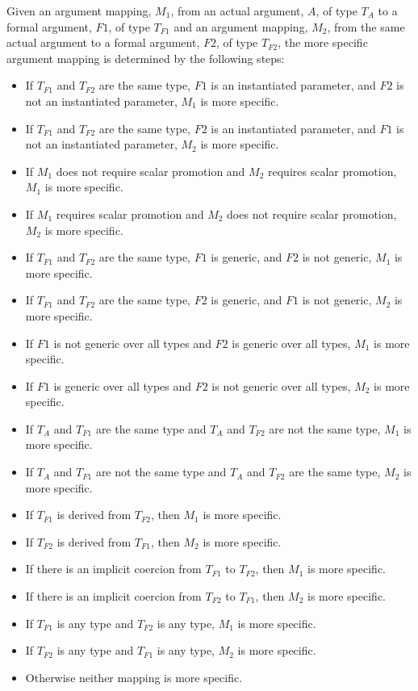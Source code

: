 Given an argument mapping, $M_1$, from an actual argument, $A$, of
type $T_A$ to a formal argument, $F1$, of type $T_{F1}$ and an
argument mapping, $M_2$, from the same actual argument to a formal
argument, $F2$, of type $T_{F2}$, the more specific argument mapping
is determined by the following steps:
\begin{itemize}
\item
 If $T_{F1}$ and $T_{F2}$ are the same type, $F1$ is an instantiated
 parameter, and $F2$ is not an instantiated parameter, $M_1$ is more
 specific.
\item
 If $T_{F1}$ and $T_{F2}$ are the same type, $F2$ is an instantiated
 parameter, and $F1$ is not an instantiated parameter, $M_2$ is more
 specific.
\item
 If $M_1$ does not require scalar promotion and $M_2$ requires scalar
 promotion, $M_1$ is more specific.
\item
 If $M_1$ requires scalar promotion and $M_2$ does not require scalar
 promotion, $M_2$ is more specific.
\item
 If $T_{F1}$ and $T_{F2}$ are the same type, $F1$ is generic, and $F2$
 is not generic, $M_1$ is more specific.
\item
 If $T_{F1}$ and $T_{F2}$ are the same type, $F2$ is generic, and $F1$
 is not generic, $M_2$ is more specific.
\item
 If $F1$ is not generic over all types and $F2$ is generic over all
 types, $M_1$ is more specific.
\item
 If $F1$ is generic over all types and $F2$ is not generic over all
 types, $M_2$ is more specific.
\item
 If $T_A$ and $T_{F1}$ are the same type and $T_A$ and $T_{F2}$ are
 not the same type, $M_1$ is more specific.
\item
 If $T_A$ and $T_{F1}$ are not the same type and $T_A$ and $T_{F2}$
 are the same type, $M_2$ is more specific.
\item
 If $T_{F1}$ is derived from $T_{F2}$, then $M_1$ is more specific.
\item
 If $T_{F2}$ is derived from $T_{F1}$, then $M_2$ is more specific.
\item
 If there is an implicit coercion from $T_{F1}$ to $T_{F2}$, then
 $M_1$ is more specific.
\item
 If there is an implicit coercion from $T_{F2}$ to $T_{F1}$, then
 $M_2$ is more specific.
\item
 If $T_{F1}$ is any  type and $T_{F2}$ is any 
 type, $M_1$ is more specific.
\item
 If $T_{F2}$ is any  type and $T_{F1}$ is any 
 type, $M_2$ is more specific.
\item
 Otherwise neither mapping is more specific.
\end{itemize}

